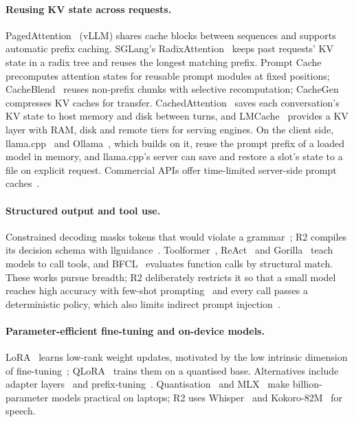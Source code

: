 \documentclass[10pt,twocolumn,letterpaper]{article}
\theoremstyle{definition}
\begin{document}
\paragraph{Reusing KV state across requests.}
PagedAttention~\cite{kwon2023pagedattention} (vLLM) shares cache blocks between sequences and
supports automatic prefix caching. SGLang's RadixAttention~\cite{zheng2024sglang} keeps past
requests' KV state in a radix tree and reuses the longest matching prefix. Prompt
Cache~\cite{gim2024promptcache} precomputes attention states for reusable prompt modules at fixed
positions; CacheBlend~\cite{yao2025cacheblend} reuses non-prefix chunks with selective
recomputation; CacheGen~\cite{liu2024cachegen} compresses KV caches for transfer.
CachedAttention~\cite{gao2024cachedattention} saves each conversation's KV state to host memory and
disk between turns, and LMCache~\cite{cheng2025lmcache} provides a KV layer with RAM, disk and remote
tiers for serving engines. On the client side, llama.cpp~\cite{gerganov2023llamacpp} and
Ollama~\cite{ollama2023}, which builds on it, reuse the prompt prefix of a loaded model in memory, and
llama.cpp's server can save and restore a slot's state to a file on explicit request. Commercial
APIs offer time-limited server-side prompt caches~\cite{anthropic2024promptcaching}.

\paragraph{Structured output and tool use.}
Constrained decoding masks tokens that would violate a grammar~\cite{willard2023outlines,
geng2023grammar,dong2025xgrammar,beurer2023lmql}; R2 compiles its decision schema with
llguidance~\cite{llguidance2025}. Toolformer~\cite{schick2023toolformer}, ReAct~\cite{yao2023react}
and Gorilla~\cite{patil2024gorilla} teach models to call tools, and BFCL~\cite{patil2025bfcl}
evaluates function calls by structural match. These works pursue breadth; R2 deliberately restricts
it so that a small model reaches high accuracy with few-shot prompting~\cite{brown2020language} and
every call passes a deterministic policy, which also limits indirect prompt
injection~\cite{greshake2023injection}.

\paragraph{Parameter-efficient fine-tuning and on-device models.}
LoRA~\cite{hu2022lora} learns low-rank weight updates, motivated by the low intrinsic dimension of
fine-tuning~\cite{aghajanyan2021intrinsic}; QLoRA~\cite{dettmers2023qlora} trains them on a quantised
base. Alternatives include adapter layers~\cite{houlsby2019adapters} and
prefix-tuning~\cite{li2021prefix}. Quantisation~\cite{frantar2023gptq,lin2024awq} and
MLX~\cite{hannun2023mlx} make billion-parameter models practical on laptops; R2 uses
Whisper~\cite{radford2023whisper} and Kokoro-82M~\cite{hexgrad2024kokoro,li2023styletts2} for speech.
\end{document}
